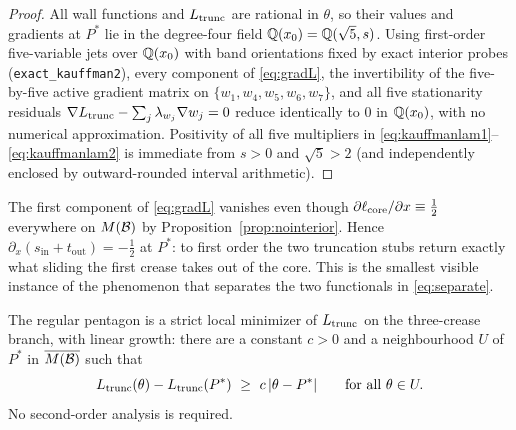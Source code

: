 \begin{proof}
All wall functions and $L_{\mathrm{trunc}}$ are rational in $\theta$, so their values and gradients at $P^*$ lie in the degree-four field $\mathbb{Q}(x_0)=\mathbb{Q}(\sqrt5,s)$. Using first-order five-variable jets over $\mathbb{Q}(x_0)$ with band orientations fixed by exact interior probes (\texttt{exact\_kauffman2}), every component of \eqref{eq:gradL}, the invertibility of the five-by-five active gradient matrix on $\{w_1,w_4,w_5,w_6,w_7\}$, and all five stationarity residuals $\nabla L_{\mathrm{trunc}}-\sum_j\lambda_{w_j}\nabla w_j=0$ reduce identically to $0$ in $\mathbb{Q}(x_0)$, with no numerical approximation. Positivity of all five multipliers in \eqref{eq:kauffmanlam1}--\eqref{eq:kauffmanlam2} is immediate from $s>0$ and $\sqrt5>2$ (and independently enclosed by outward-rounded interval arithmetic).
\end{proof}

\begin{observation}\label{obs:xcancel}
The first component of \eqref{eq:gradL} vanishes even though $\partial\ell_{\mathrm{core}}/\partial x\equiv\frac12$ everywhere on $M(\mathcal{B})$ by Proposition~\ref{prop:nointerior}. Hence $\partial_x(s_{\mathrm{in}}+t_{\mathrm{out}})=-\frac12$ at $P^*$: to first order the two truncation stubs return exactly what sliding the first crease takes out of the core. This is the smallest visible instance of the phenomenon that separates the two functionals in \eqref{eq:separate}.
\end{observation}

\begin{theorem}\label{thm:strictL}
The regular pentagon is a strict local minimizer of $L_{\mathrm{trunc}}$ on the three-crease branch, with linear growth: there are a constant $c>0$ and a neighbourhood $U$ of $P^*$ in $\overline{M(\mathcal{B})}$ such that
\begin{equation}\label{eq:lingrowth}
  \trunc(\theta)-\trunc(P^*)\ \ge\ c\,\lvert\theta-P^*\rvert\qquad\text{for all }\theta\in U .
\end{equation}
No second-order analysis is required.
\end{theorem}

